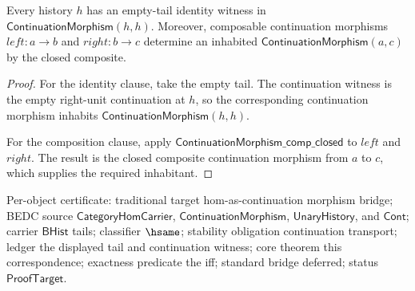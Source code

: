 \begin{theorem}
\label{thm:continuation-morphism-identity-composition-closure}
Every history $h$ has an empty-tail identity witness in
$\mathsf{ContinuationMorphism}(h,h)$. Moreover, composable continuation
morphisms $left:a\to b$ and $right:b\to c$ determine an inhabited
$\mathsf{ContinuationMorphism}(a,c)$ by the closed composite.
\end{theorem}
\begin{proof}
For the identity clause, take the empty tail. The continuation witness is the
empty right-unit continuation at $h$, so the corresponding continuation
morphism inhabits $\mathsf{ContinuationMorphism}(h,h)$.

For the composition clause, apply
$\mathsf{ContinuationMorphism\_comp\_closed}$ to $left$ and $right$. The result
is the closed composite continuation morphism from $a$ to $c$, which supplies
the required inhabitant.
\end{proof}

Per-object certificate: traditional target hom-as-continuation morphism bridge;
BEDC source $\mathsf{CategoryHomCarrier}$, $\mathsf{ContinuationMorphism}$,
$\mathsf{UnaryHistory}$, and $\mathsf{Cont}$; carrier $\mathsf{BHist}$ tails;
classifier $\hsame$; stability obligation continuation transport; ledger the
displayed tail and continuation witness; core theorem this correspondence;
exactness predicate the iff; standard bridge deferred; status
$\mathsf{ProofTarget}$.

